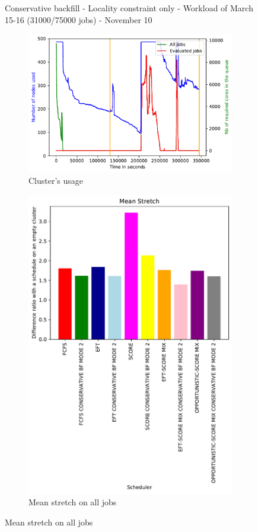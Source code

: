 \documentclass[a4paper]{article}
\begin{document}
\begin{figure}[H]
\caption{Conservative backfill - Locality constraint only - Workload of March 15-16 (31000/75000 jobs) - November 10}\end{figure}

\begin{figure}[H]\centering
\begin{subfigure}[b]{0.4\linewidth}\centering\includegraphics[width=1\linewidth]{MBSS/plot/2022-04-07->2022-04-09_V9271_Fcfs_Used_nodes_450_128_32_256_4_1024.pdf}\caption{Cluster's usage}\end{subfigure}
\begin{subfigure}[b]{0.4\linewidth}\centering\includegraphics[width=0.9\linewidth]{MBSS/plot/Results_FCFS_Score_Backfill_2022-04-07->2022-04-09_V9271_Mean_Stretch_450_128_32_256_4_1024.pdf}\caption{Mean stretch on all jobs}\end{subfigure}

\end{figure}
\end{document}
